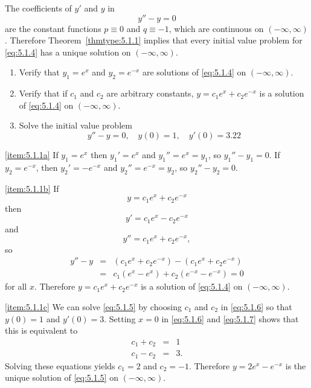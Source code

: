 \documentclass{ximera}
\begin{document}
\begin{example}\label{example:5.1.1}  
The coefficients of $y'$ and $y$ in
\begin{equation}\label{eq:5.1.4}
y''-y=0
\end{equation}
are the constant functions $p\equiv0$ and $q\equiv-1$, which are
continuous on $(-\infty,\infty)$. Therefore Theorem~\ref{thmtype:5.1.1}
implies that every initial value problem for \eqref{eq:5.1.4}  has a
unique solution on $(-\infty,\infty)$.

\begin{enumerate}
\item \label{item:5.1.1a} %
Verify that $y_1=e^x$ and $y_2=e^{-x}$ are solutions of
\eqref{eq:5.1.4} on $(-\infty,\infty)$.
\item \label{item:5.1.1b}%
Verify that if $c_1$ and $c_2$ are arbitrary constants,
$y=c_1e^x+c_2e^{-x}$ is a solution of \eqref{eq:5.1.4} on
$(-\infty,\infty)$.
\item \label{item:5.1.1c}%
Solve the initial value problem
\begin{equation}\label{eq:5.1.5}
y''-y=0,\quad y(0)=1,\quad y'(0)=3.22
\end{equation}
\end{enumerate}
\begin{explanation}

\ref{item:5.1.1a} If $y_1=e^x$ then $y_1'=e^x$ and $y_1''=e^x=y_1$,
so  $y_1''-y_1=0$.
If $y_2=e^{-x}$, then $y_2'=-e^{-x}$ and $y_2''=e^{-x}=y_2$,
so  $y_2''-y_2=0$.

\ref{item:5.1.1b} If
\begin{equation}\label{eq:5.1.6}
y=c_1e^x+c_2e^{-x}
\end{equation}
 then
\begin{equation}\label{eq:5.1.7}
y'=c_1e^x-c_2e^{-x}
\end{equation}
and
$$
y''=c_1e^x+c_2e^{-x},
$$
 so
\begin{eqnarray*}
y''-y&=&(c_1e^x+c_2e^{-x})-(c_1e^x+c_2e^{-x})\\
&=&c_1(e^x-e^x)+c_2(e^{-x}-e^{-x})=0
\end{eqnarray*}
for all $x$. Therefore $y=c_1e^x+c_2e^{-x}$ is a solution of
\eqref{eq:5.1.4} on $(-\infty,\infty)$.

\ref{item:5.1.1c}
We can solve \eqref{eq:5.1.5} by choosing $c_1$ and $c_2$ in \eqref{eq:5.1.6}
so that $y(0)=1$ and $y'(0)=3$. Setting $x=0$ in \eqref{eq:5.1.6} and
\eqref{eq:5.1.7} shows that this is equivalent to
\begin{eqnarray*}
c_1+c_2&=&1\\
c_1-c_2&=&3.
\end{eqnarray*}
Solving these equations yields  $c_1=2$  and $c_2=-1$.
Therefore $y=2e^x-e^{-x}$ is the unique solution of
\eqref{eq:5.1.5} on $(-\infty,\infty)$.
\end{explanation}
\end{example}
\end{document}
